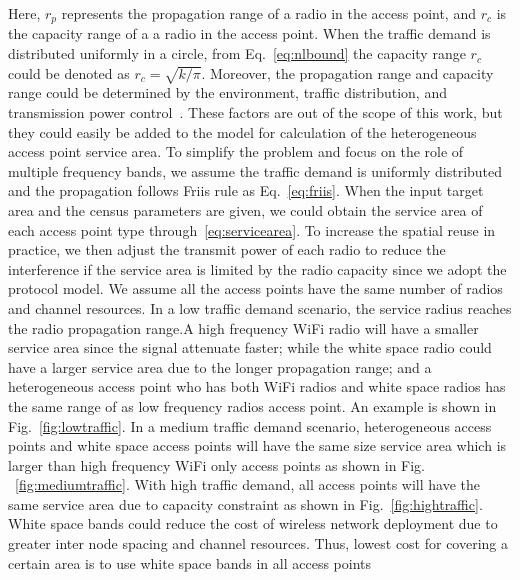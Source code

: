 Here, $r_p$ represents the propagation range of a radio in the access point, and $r_c$ is the capacity range of 
a a radio in the access point. When the traffic demand is distributed uniformly in a circle, from 
Eq.~\ref{eq:nlbound} the capacity range $r_c$ could be denoted as $r_c=\sqrt{k/\pi}$. Moreover,
the propagation range and capacity range could be determined by the environment, traffic distribution, and
transmission power control~\cite{robinson2010deploying}. These factors are out of the scope of this work, 
but they could easily be added to the model for calculation of the heterogeneous access point service area. 
To simplify the problem and focus on the role of multiple frequency bands, we assume the traffic demand is 
uniformly distributed and the propagation follows Friis rule as Eq.~\ref{eq:friis}. 
When the input target area and the census parameters are given, we could obtain the service area of
each access point type through~\ref{eq:servicearea}. To increase the spatial reuse in practice, we then 
adjust the transmit power of each radio to reduce the interference if the service area is limited by the 
radio capacity since we adopt the protocol model.
We assume all the access points have the same number of radios and channel resources.
In a low traffic demand scenario, the service radius reaches the radio propagation range.A high frequency 
WiFi radio will have a smaller service area since the signal attenuate faster; while the white space radio 
could have a larger service area due to the longer propagation range; and a heterogeneous access point who 
has both WiFi radios and white space radios has the same range of as low frequency radios access point. 
An example is shown in Fig.~\ref{fig:lowtraffic}.
In a medium traffic demand scenario, heterogeneous access points and white space access points will 
have the same size service area which is larger than high frequency WiFi only access points as shown in Fig.
~\ref{fig:mediumtraffic}.
With high traffic demand, all access points will have the same service area due to capacity constraint 
as shown in Fig.~\ref{fig:hightraffic}. White space bands could reduce the cost of wireless network 
deployment due to greater inter node spacing and channel resources. 
Thus, lowest cost for covering a certain area is to use white space bands in all access points 
